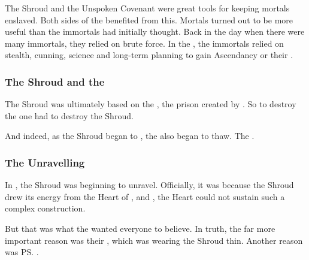 The Shroud and the Unspoken Covenant were great tools for keeping mortals enslaved. 
Both sides of the \Feud benefited from this.
Mortals turned out to be more useful than the immortals had initially thought.
Back in the day when there were many immortals, they relied on brute force.
In the , the immortals relied on stealth, cunning, science and long-term planning to gain Ascendancy or their \matrices.




\subsubsection{The Shroud and the \CrystalSphere}
\index{\CrystalSphere}%
The Shroud was ultimately based on the \CrystalSphere, the \psp{\banelords}{} prison created by \TyarithXserasshana. 
So to destroy the \CrystalSphere{} one had to destroy the Shroud. 

And indeed, as the Shroud began to , the \CrystalSphere{} also began to thaw. 
The . 





\subsubsection{The Unravelling}
In \SentinelsofMithEmph, the Shroud was beginning to unravel. 
Officially, it was because the Shroud drew its energy from the Heart of \Miith{}, and , the Heart could not sustain such a complex construction. 

But that was what the \banelords{} wanted everyone to believe. 
In truth, the far more important reason was their , which was wearing the Shroud thin. 
Another reason was \ps{\Secherdamon} . 

